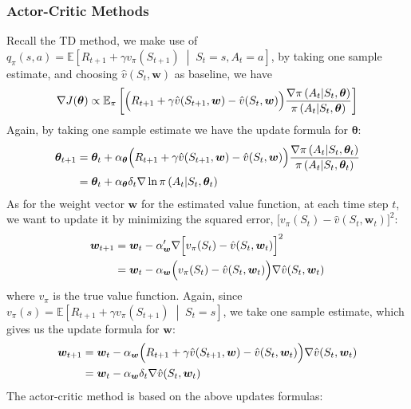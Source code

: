 \documentclass[11pt]{article}
\begin{document}
\subsubsection{Actor-Critic Methods}
Recall the TD method, we make use of 
\(q_\pi(s,a)=\mathbb{E}\left[R_{t+1}+\gamma v_\pi(S_{t+1})\;\middle|\;
S_t=s, A_t=a\right]\), by taking one sample estimate, and choosing
\(\hat{v}(S_t, \bm{w})\) as baseline, we have
\[\nabla J(\bm{\theta})\propto\mathbb{E}_\pi\left[
        \Bigl(R_{t+1}+\gamma \hat{v}(S_{t+1}, \bm{w})-\hat{v}(S_t, \bm{w})\Big)
        \frac{\nabla\pi\left(A_t\middle|S_t, \bm{\theta}\right)}
{\pi\left(A_t\middle|S_t, \bm{\theta}\right)}\right]\]
Again, by taking one sample estimate we have the update formula for 
\(\bm{\theta}\):
\begin{align*}
    \bm{\theta}_{t+1}
    &=\bm{\theta}_t + \alpha_{\bm{\theta}}
    \Bigl(R_{t+1}+\gamma \hat{v}(S_{t+1}, \bm{w})-\hat{v}(S_t, \bm{w})\Big)
    \frac{\nabla\pi\left(A_t\middle|S_t, \bm{\theta}_t\right)}
    {\pi\left(A_t\middle|S_t, \bm{\theta}_t\right)}\\
    &=\bm{\theta}_t+\alpha_{\bm{\theta}}\delta_t
    \nabla\ln{\pi\left(A_t\middle|S_t, \bm{\theta}_t\right)}
\end{align*}
As for the weight vector \(\bm{w}\) for the estimated value function, at each 
time step \(t\), we want to update it by minimizing the squared error,
\(\bigl[v_\pi(S_t)-\hat{v}(S_t, \bm{w}_t)\bigr]^2\):
\begin{align*}
    \bm{w}_{t+1} 
    &= \bm{w}_t - 
    \alpha_{\bm{w}}'\nabla \Bigl[v_\pi(S_t)-\hat{v}(S_t, \bm{w}_t)\Bigr]^2\\
    &= \bm{w}_t - \alpha_{\bm{w}}\Bigl(v_\pi(S_t)-\hat{v}(S_t, \bm{w}_t)
    \Bigr)\nabla \hat{v}(S_t, \bm{w}_t)
\end{align*}
where \(v_\pi\) is the true value function. Again, since \(v_\pi(s)=
\mathbb{E}\left[R_{t+1}+\gamma v_\pi(S_{t+1})\;\middle|\;S_t=s\right]\), we
take one sample estimate, which gives us the update formula for \(\bm{w}\):
\begin{align*}
    \bm{w}_{t+1} 
    &= \bm{w}_t - \alpha_{\bm{w}}
    \Bigl(R_{t+1}+\gamma\hat{v}(S_{t+1},\bm{w})-\hat{v}(S_t, \bm{w}_t)
    \Bigr)\nabla \hat{v}(S_t, \bm{w}_t)\\
    &=\bm{w}_t - \alpha_{\bm{w}}\delta_t\nabla \hat{v}(S_t, \bm{w}_t)
\end{align*}
The actor-critic method is based on the above updates formulas:
\end{document}

